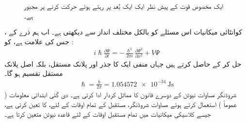  \begin{figure}
 \centering
 \caption{ایک مخصوص قوت کے پیش نظر ایک   ایک بُعد پر رہتے ہوئے حرکت کرنے پر مجبور ہے۔}
 \label{شکل_تفاعل_موج_حرکت_یک_بعدی}
 \end{figure}
کوانٹائی میکانیات اس مسئلے کو بالکل مختلف انداز سے  دیکھتی  ہے۔ اب ہم ذرے کے  ،  جس کی علامت  ہے،   کو :
\begin{align}\label{مساوات_تفاعل_موج_شروڈنگر_الف}
 i \hslash \frac{\partial \Psi}{\partial t} = - \frac{\hslash^{2}}{2m} \frac{\partial \Psi^{2}}{\partial x^{2}} + V \Psi
\end{align}
حل کر کے حاصل کرتے ہیں جہاں    منفی ایک  کا جذر  اور   پلانک  مستقل، بلکہ اصل پلانک مستقل تقسیم     ہو گا۔
\begin{align}
 \hslash = \frac{h}{2\pi} = \SI{1.054572e-34}{\joule\second} 
\end{align}
شروڈنگر  مساوات نیوٹن کے دوسرے قانون کا مماثل کردار ادا کرتی ہے۔ دی گئی ابتدائی معلومات ( عموماً  )   استعمال کرتے ہوئے  مساوات شروڈنگر،  مستقبل کے تمام اوقات کے لئے،  کا  تعین کرتی ہے، جیسے  کلاسیکی میکانیات میں تمام مستقبل اوقات کے لئے  قاعدہ نیوٹن    متعین کرتا ہے۔ 
 

